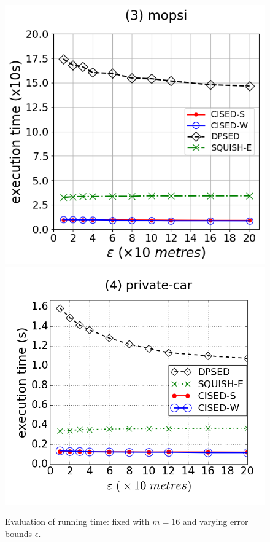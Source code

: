 \begin{figure}[tb!]
\includegraphics[scale = 0.240]{Figures/Exp-time-epsilon-mopsi.png}
\includegraphics[scale = 0.240]{Figures/Exp-time-epsilon-private.png}
\vspace{-1ex}
\caption{\small Evaluation of running time: fixed with $m=16$ and varying error bounds $\epsilon$.}
\label{fig:time-epsilon}
\vspace{-1ex}
\end{figure}



